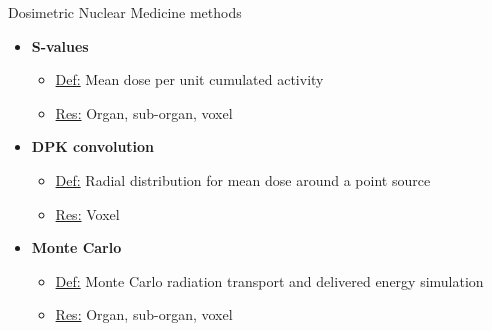\documentclass[ignorenonframetext,]{beamer}
\providecommand{\tightlist}{%
  \setlength{\itemsep}{0pt}\setlength{\parskip}{0pt}}
\begin{document}
\begin{frame}{Dosimetric Nuclear Medicine methods}
\protect\hypertarget{dosimetric-nuclear-medicine-methods}{}

\begin{itemize}
\tightlist
\item
  \textbf{S-values}

  \begin{itemize}
  \tightlist
  \item
    \underline{Def:} Mean dose per unit cumulated activity
  \item
    \underline{Res:} Organ, sub-organ, voxel
  \end{itemize}
\item
  \textbf{DPK convolution}

  \begin{itemize}
  \tightlist
  \item
    \underline{Def:} Radial distribution for mean dose around a point
    source
  \item
    \underline{Res:} Voxel
  \end{itemize}
\item
  \textbf{Monte Carlo}

  \begin{itemize}
  \tightlist
  \item
    \underline{Def:} Monte Carlo radiation transport and delivered
    energy simulation
  \item
    \underline{Res:} Organ, sub-organ, voxel
  \end{itemize}
\end{itemize}

\end{frame}
\end{document}
